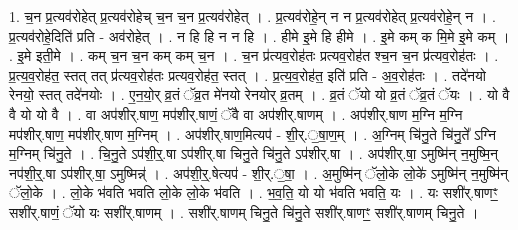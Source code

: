 \documentclass[17pt]{extarticle}
\begin{document}
1. च॒न प्र॒त्यव॑रोहेत् प्र॒त्यव॑रोहेच् च॒न च॒न प्र॒त्यव॑रोहेत् । . प्र॒त्यव॑रोहे॒न् न न प्र॒त्यव॑रोहेत् प्र॒त्यव॑रोहे॒न् न । . प्र॒त्यव॑रोहे॒दिति॑ प्रति - अव॑रोहेत् । . न हि हि न न हि । . हीमे इ॒मे हि हीमे । . इ॒मे कम् क मि॒मे इ॒मे कम् । . इ॒मे इती॒मे । . कम् च॒न च॒न कम् कम् च॒न । . च॒न प्र॑त्यव॒रोह॑तः प्रत्यव॒रोह॑त श्च॒न च॒न प्र॑त्यव॒रोह॑तः । . प्र॒त्य॒व॒रोह॑त॒ स्तत् तत् प्र॑त्यव॒रोह॑तः प्रत्यव॒रोह॑त॒ स्तत् । . प्र॒त्य॒व॒रोह॑त॒ इति॑ प्रति - अ॒व॒रोह॑तः । . तदे॑नयो रेनयो॒ स्तत् तदे॑नयोः । . ए॒न॒यो॒र् व्र॒तं ॅव्र॒त मे॑नयो रेनयोर् व्र॒तम् । . व्र॒तं ॅयो यो व्र॒तं ॅव्र॒तं ॅयः । . यो वै वै यो यो वै । . वा अप॑शीर्.षाण॒ मप॑शीर्.षाणं॒ ॅवै वा अप॑शीर्.षाणम् । . अप॑शीर्.षाण म॒ग्नि म॒ग्नि मप॑शीर्.षाण॒ मप॑शीर्.षाण म॒ग्निम् । . अप॑शीर्.षाण॒मित्यप॑ - शी॒र्.॒षा॒ण॒म् । . अ॒ग्निम् चि॑नु॒ते चि॑नु॒ते᳚ ऽग्नि म॒ग्निम् चि॑नु॒ते । . चि॒नु॒ते ऽप॑शी॒र्॒.षा ऽप॑शीर्.षा चिनु॒ते चि॑नु॒ते ऽप॑शीर्.षा । . अप॑शीर्.षा॒ ऽमुष्मि॑न् न॒मुष्मि॒न् नप॑शी॒र्॒.षा ऽप॑शीर्.षा॒ ऽमुष्मिन्न्॑ । . अप॑शी॒र्॒.षेत्यप॑ - शी॒र्.॒षा॒ । . अ॒मुष्मि॑न् ॅलो॒के लो॒के॑ ऽमुष्मि॑न् न॒मुष्मि॑न् ॅलो॒के । . लो॒के भ॑वति भवति लो॒के लो॒के भ॑वति । . भ॒व॒ति॒ यो यो भ॑वति भवति॒ यः । . यः सशी॑र्.षाणꣳ॒॒ सशी॑र्.षाणं॒ ॅयो यः सशी॑र्.षाणम् । . सशी॑र्.षाणम् चिनु॒ते चि॑नु॒ते सशी॑र्.षाणꣳ॒॒ सशी॑र्.षाणम् चिनु॒ते । \newline
\end{document}

